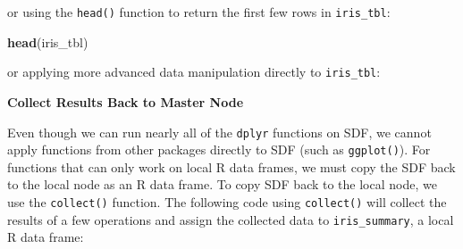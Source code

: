 \documentclass[12pt,]{krantz}
\makeatletter
\newenvironment{Shaded}{\begin{snugshade}}{\end{snugshade}}
\newcommand{\DataTypeTok}[1]{\textcolor[rgb]{0.27,0.27,0.27}{#1}}
\newcommand{\DecValTok}[1]{\textcolor[rgb]{0.06,0.06,0.06}{#1}}
\newcommand{\KeywordTok}[1]{\textcolor[rgb]{0.27,0.27,0.27}{\textbf{#1}}}
\newcommand{\NormalTok}[1]{#1}
\newcommand{\OperatorTok}[1]{\textcolor[rgb]{0.43,0.43,0.43}{\textbf{#1}}}
\newcommand{\StringTok}[1]{\textcolor[rgb]{0.5,0.5,0.5}{#1}}
\newenvironment{kframe}{%
\medskip{}
\setlength{\fboxsep}{.8em}
 \def\at@end@of@kframe{}%
 \ifinner\ifhmode%
  \def\at@end@of@kframe{\end{minipage}}%
  \begin{minipage}{\columnwidth}%
 \fi\fi%
 \def\FrameCommand##1{\hskip\@totalleftmargin \hskip-\fboxsep
 \colorbox{shadecolor}{##1}\hskip-\fboxsep
     \hskip-\linewidth \hskip-\@totalleftmargin \hskip\columnwidth}%
 \MakeFramed {\advance\hsize-\width
   \@totalleftmargin\z@ \linewidth\hsize
   \@setminipage}}%
 {\par\unskip\endMakeFramed%
 \at@end@of@kframe}
\renewenvironment{Shaded}{\begin{kframe}}{\end{kframe}}
\makeatother
\begin{document}
\begin{Shaded}
\end{Shaded}

or using the \texttt{head()} function to return the first few rows in \texttt{iris\_tbl}:

\begin{Shaded}
\begin{Highlighting}[]
\KeywordTok{head}\NormalTok{(iris_tbl)}
\end{Highlighting}
\end{Shaded}

or applying more advanced data manipulation directly to \texttt{iris\_tbl}:

\begin{Shaded}
\end{Shaded}

\textbf{Collect Results Back to Master Node}

Even though we can run nearly all of the \texttt{dplyr} functions on SDF, we cannot apply functions from other packages directly to SDF (such as \texttt{ggplot()}). For functions that can only work on local R data frames, we must copy the SDF back to the local node as an R data frame. To copy SDF back to the local node, we use the \texttt{collect()} function. The following code using \texttt{collect()} will collect the results of a few operations and assign the collected data to \texttt{iris\_summary}, a local R data frame:
\end{document}
